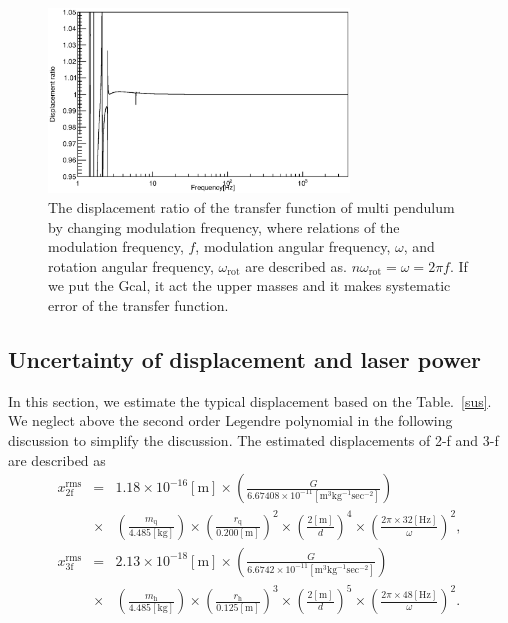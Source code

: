 \documentclass[%
 reprint,
superscriptaddress,
 amsmath,amssymb,
 aps,
]{revtex4-1}
\begin{document}
\begin{figure}
\begin{center}
\includegraphics[width=8cm]{dx_Gcal_ratio.eps}
\caption{The displacement ratio of the transfer function of multi pendulum by changing modulation frequency, where relations of the modulation frequency, $f$, modulation angular frequency, $\omega$, and rotation angular frequency, $\omega_{\mathrm{rot}}$ are described as. $n\omega_{\mathrm{rot}}=\omega=2\pi f$. If we put the Gcal, it act the upper masses and it makes systematic error of the transfer function.}
\label{fig:ratio}
\end{center}
\end{figure}

\subsection{Uncertainty of displacement and  laser power}
In this section, we estimate the typical displacement based on the Table.~\ref{sus}. We neglect above the second order Legendre polynomial in the following discussion to simplify the discussion. 
 The estimated displacements of 2-f and 3-f are described as
 \footnotesize
\begin{eqnarray}
x^{\mathrm{rms}}_{\mathrm{2f}}&=&1.18 \times 10^{-16}\mathrm{[m]} \times \left( \frac{G}{6.67408 \times 10^{-11} \mathrm{[m^3kg^{-1}sec^{-2}]}} \right) \nonumber \\
&\times&\! \left( \! \frac{m_{\mathrm{q}}}{4.485 \mathrm{[kg]}} \!\right) \! \times \!\left( \!\frac{r_{\mathrm{q}}}{0.200 \mathrm{[m]}} \! \right)^2 \! \times \! \left( \! \frac{2\mathrm{[m]}}{d} \! \right)^4 \! \times \! \left( \! \frac{2\pi \! \times \! 32\mathrm{[Hz]}}{\omega} \! \right)^2,\\
x^{\mathrm{rms}}_{\mathrm{3f}}&=&2.13 \times 10^{-18}\mathrm{[m]} \times \left( \frac{G}{6.6742 \times 10^{-11} \mathrm{[m^3kg^{-1}sec^{-2}]}} \right) \nonumber \\
&\times& \! \left( \! \frac{m_{\mathrm{h}}}{4.485 \mathrm{[kg]}}\! \right) \! \times \! \left(  \!\frac{r_{\mathrm{h}}}{0.125 \mathrm{[m]}} \! \right)^3 
\! \times \! \left(\! \frac{2\mathrm{[m]}}{d} \! \right)^5 \! \times \! \left( \! \frac{2\pi\!\times \! 48\mathrm{[Hz]}}{\omega} \! \right)^2.
\end{eqnarray}
\normalsize
\end{document}
